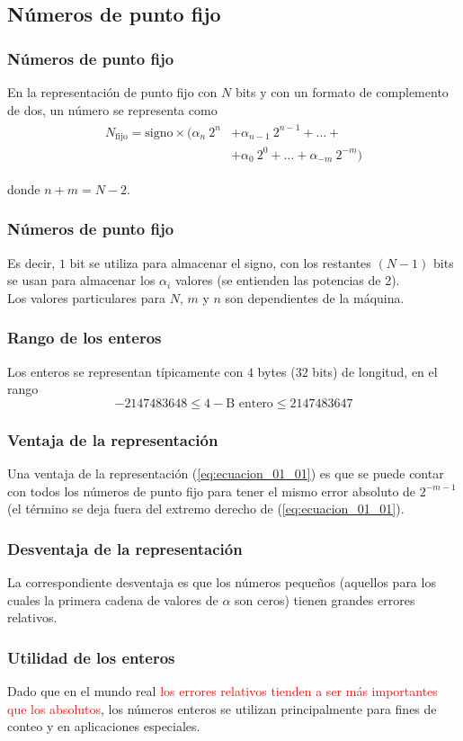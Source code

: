 \subsection{Números de punto fijo}
\begin{frame}
\frametitle{Números de punto fijo}
En la representación de punto fijo con $N$ bits y con un formato de complemento de dos, un número se representa como
\begin{align}
\begin{aligned}
N_{\mbox{fijo}} = \mbox{signo} \times (\alpha_{n} \: 2^{n} &+ \alpha_{n-1} \: 2^{n-1} + \ldots + \\
&+ \alpha_{0} \: 2^{0} + \ldots + \alpha_{-m} \: 2^{-m} )
\label{eq:ecuacion_01_01}
\end{aligned}
\end{align}

donde $n + m = N - 2$.
\end{frame}
\begin{frame}
\frametitle{Números de punto fijo}
Es decir, $1$ bit se utiliza para almacenar el signo, con los restantes $(N - 1)$ bits se usan para almacenar los $\alpha_{i}$ valores (se entienden las potencias de 2).
\\
\bigskip
Los valores particulares para $N$, $m$ y $n$ son dependientes de la máquina.
\end{frame}
\begin{frame}
\frametitle{Rango de los enteros}
Los enteros se representan típicamente con $4$ bytes ($32$ bits) de longitud, en el rango
\[ -2147483648 \leq 4-\mbox{B entero} \leq 2147483647 \]
\end{frame}
\begin{frame}
\frametitle{Ventaja de la representación}
Una ventaja de la representación (\ref{eq:ecuacion_01_01}) es que se puede contar con todos los números de punto fijo para tener el mismo error absoluto de $2^{-m-1}$ (el término se deja fuera del extremo derecho de (\ref{eq:ecuacion_01_01}).
\end{frame}
\begin{frame}
\frametitle{Desventaja de la representación}
 La correspondiente desventaja es que los números pequeños (aquellos para los cuales la primera cadena de valores de $\alpha$ son ceros) tienen grandes errores relativos.
 \end{frame}
 \begin{frame}
 \frametitle{Utilidad de los enteros}
 Dado que en el mundo real \textcolor{red}{los errores relativos tienden a ser más importantes que los absolutos}, los números enteros se utilizan principalmente para fines de conteo y en aplicaciones especiales.
\end{frame}
